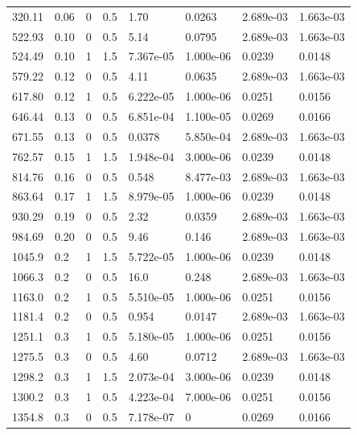 \documentclass[preview]{standalone}
\begin{document}
{{\begin{tabular}{L{1.2cm}C{1.2cm} C{0.3cm}C{0.5cm} C{1.4cm}C{1.4cm} C{1.4cm}C{1.4cm}}
  320.11  &  0.06  & 0     & 0.5 &  1.70  & 0.0263  & 2.689e-03 &  1.663e-03   \\ 
  522.93  &  0.10  & 0     & 0.5 &  5.14  & 0.0795  & 2.689e-03 &  1.663e-03   \\ 
  524.49  &  0.10  & 1     & 1.5 &  7.367e-05  & 1.000e-06  & 0.0239 &  0.0148   \\ 
  579.22  &  0.12  & 0     & 0.5 &  4.11  & 0.0635  & 2.689e-03 &  1.663e-03   \\ 
  617.80  &  0.12  & 1     & 0.5 &  6.222e-05  & 1.000e-06  & 0.0251 &  0.0156   \\ 
  646.44  &  0.13  & 0     & 0.5 &  6.851e-04  & 1.100e-05  & 0.0269 &  0.0166   \\ 
  671.55  &  0.13  & 0     & 0.5 &  0.0378  & 5.850e-04  & 2.689e-03 &  1.663e-03   \\ 
  762.57  &  0.15  & 1     & 1.5 &  1.948e-04  & 3.000e-06  & 0.0239 &  0.0148   \\ 
  814.76  &  0.16  & 0     & 0.5 &  0.548  & 8.477e-03  & 2.689e-03 &  1.663e-03   \\ 
  863.64  &  0.17  & 1     & 1.5 &  8.979e-05  & 1.000e-06  & 0.0239 &  0.0148   \\ 
  930.29  &  0.19  & 0     & 0.5 &  2.32  & 0.0359  & 2.689e-03 &  1.663e-03   \\ 
  984.69  &  0.20  & 0     & 0.5 &  9.46  & 0.146  & 2.689e-03 &  1.663e-03   \\ 
  1045.9  &   0.2  & 1     & 1.5 &  5.722e-05  & 1.000e-06  & 0.0239 &  0.0148   \\ 
  1066.3  &   0.2  & 0     & 0.5 &  16.0  & 0.248  & 2.689e-03 &  1.663e-03   \\ 
  1163.0  &   0.2  & 1     & 0.5 &  5.510e-05  & 1.000e-06  & 0.0251 &  0.0156   \\ 
  1181.4  &   0.2  & 0     & 0.5 &  0.954  & 0.0147  & 2.689e-03 &  1.663e-03   \\ 
  1251.1  &   0.3  & 1     & 0.5 &  5.180e-05  & 1.000e-06  & 0.0251 &  0.0156   \\ 
  1275.5  &   0.3  & 0     & 0.5 &  4.60  & 0.0712  & 2.689e-03 &  1.663e-03   \\ 
  1298.2  &   0.3  & 1     & 1.5 &  2.073e-04  & 3.000e-06  & 0.0239 &  0.0148   \\ 
  1300.2  &   0.3  & 1     & 0.5 &  4.223e-04  & 7.000e-06  & 0.0251 &  0.0156   \\ 
  1354.8  &   0.3  & 0     & 0.5 &  7.178e-07  & 0  & 0.0269 &  0.0166   \\ 

\end{tabular}}}
\end{document}
